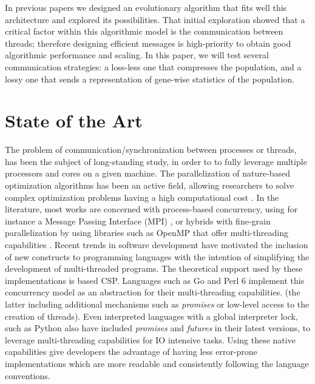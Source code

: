 \documentclass[sigconf]{acmart}\usepackage[]{graphicx}\usepackage[]{color}
\begin{document}
In previous papers
\cite{Merelo:2018:MEA:3205651.3208317:anon,merelo:WEA:anon} we
designed an evolutionary algorithm that fits well this architecture
and explored its possibilities. That initial exploration showed that
a critical factor within this algorithmic model is the communication between threads; therefore designing
efficient messages is high-priority to obtain good algorithmic
performance and scaling. In this paper, we will test several
communication strategies: a loss-less one that compresses the population,
and a lossy one that sends a representation of gene-wise
statistics of the population.

\section{State of the Art}

The problem of communication/synchronization
between processes or threads, has been the subject of 
long-standing study, in order to to fully leverage multiple
processors and cores on a given machine. The parallelization of nature-based 
optimization algorithms has been an active field, allowing researchers
to solve complex optimization problems having a high computational 
cost \cite{Lalwani2019}. In the literature, most works are concerned 
with process-based concurrency, using for instance a Message Passing Interface 
(MPI) \cite{gropp1999using}, or hybrids with fine-grain
parallelization by using libraries such as OpenMP \cite{dagum1998openmp}
that offer multi-threading capabilities \cite{jin2011high}. Recent trends
in software development have motivated the inclusion of new 
constructs to programming languages with the intention of simplifying 
the development of multi-threaded programs. The theoretical support 
used by these implementations is based CSP. Languages such as Go 
and Perl 6 implement this concurrency model as an abstraction for 
their multi-threading capabilities. (the latter including additional mechanisms such as 
{\em promises} or low-level access to the creation of threads). Even 
interpreted languages with a global interpreter lock, such as Python also
have included {\em promises} and {\em futures} in their latest versions,
to leverage multi-threading capabilities for IO intensive tasks.
Using these native capabilities give developers the advantage of
having less error-prone implementations which are more readable and consistently
following the language conventions. 




\end{document}

